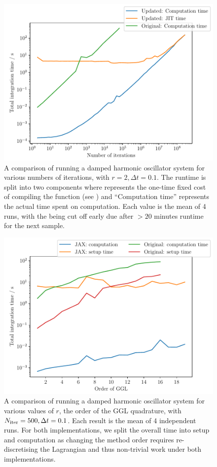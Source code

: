 \begin{figure}[t]
  \includegraphics[width=\columnwidth]{figures/dho_n_runtime.pdf}
  \caption{A comparison of running a damped harmonic oscillator system for various numbers of iterations, with $r = 2, \Delta t = 0.1$. The \updimpl{} runtime is split into two components where  represents the one-time fixed cost of compiling the function (see ) and \enquote{Computation time} represents the actual time spent on computation.
  Each value is the mean of 4 runs, with the \orgimpl{} being cut off early due after $> 20$ minutes runtime for the next sample.}
  \label{fig:dho-n-runtime}
\end{figure}

\begin{figure}[t]
  \includegraphics[width=\columnwidth]{figures/dho_r_runtime.pdf}
  \caption{A comparison of running a damped harmonic oscillator system for various values of $r$, the order of the GGL quadrature, with $N_{\mathrm{iter}} = 500, \Delta t = 0.1$. Each result is the mean of 4 independent runs.
	For both implementations, we split the overall time into setup and computation as changing the method order requires re-discretising the Lagrangian and thus non-trivial work under both implementations.}
  \label{fig:dho-r-runtime}
\end{figure}

